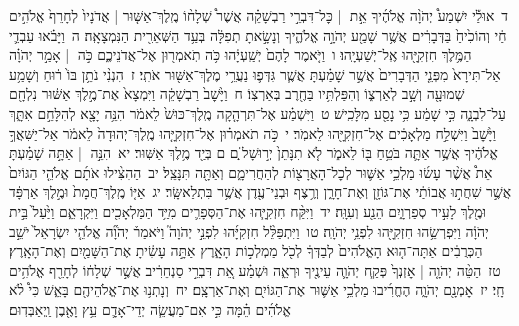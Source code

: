 \documentclass[18pt]{article}
\newcommand{\vart}[1]{\Bfootnote{#1}}	%
\begin{document}
 {\loc ד~}אוּלַ֡י יִשְׁמַע֩ יְהֹוָ֨ה אֱלֹהֶ֜יךָ אֵ֣ת  |  כׇּל־דִּבְרֵ֣י רַבְשָׁקֵ֗ה אֲשֶׁר֩ שְׁלָח֨וֹ מֶֽלֶךְ־אַשּׁ֤וּר  |  אֲדֹנָיו֙ לְחָרֵף֙ אֱלֹהִ֣ים חַ֔י וְהוֹכִ֙יחַ֙ בַּדְּבָרִ֔ים אֲשֶׁ֥ר שָׁמַ֖ע יְהֹוָ֣ה אֱלֹהֶ֑יךָ וְנָשָׂ֣אתָ תְפִלָּ֔ה בְּעַ֥ד הַשְּׁאֵרִ֖ית הַנִּמְצָאָֽה׃ \startlock
 {\loc ה~}וַיָּבֹ֗אוּ עַבְדֵ֛י הַמֶּ֥לֶךְ חִזְקִיָּ֖הוּ אֶֽל־יְשַׁעְיָֽהוּ׃ \startlock
 {\loc ו~}וַיֹּ֤אמֶר לָהֶם֙ יְשַֽׁעְיָ֔הוּ כֹּ֥ה תֹֽאמְר֖וּן אֶל־אֲדֹנֵיכֶ֑ם כֹּ֣ה  |  אָמַ֣ר יְהֹוָ֗ה אַל־תִּירָא֙ מִפְּנֵ֤י הַדְּבָרִים֙ אֲשֶׁ֣ר שָׁמַ֗עְתָּ אֲשֶׁ֧ר גִּדְּפ֛וּ נַעֲרֵ֥י מֶלֶךְ־אַשּׁ֖וּר אֹתִֽי׃ \startlock
 {\loc ז~}הִנְנִ֨י נֹתֵ֥ן בּוֹ֙ ר֔וּחַ וְשָׁמַ֥ע שְׁמוּעָ֖ה וְשָׁ֣ב לְאַרְצ֑וֹ וְהִפַּלְתִּ֥יו בַּחֶ֖רֶב בְּאַרְצֽוֹ׃ \startlock
 {\loc ח~}וַיָּ֙שׇׁב֙ רַבְשָׁקֵ֔ה וַיִּמְצָא֙ אֶת־מֶ֣לֶךְ אַשּׁ֔וּר נִלְחָ֖ם עַל־לִבְנָ֑ה כִּ֣י שָׁמַ֔ע כִּ֥י נָסַ֖ע מִלָּכִֽישׁ׃ \startlock
 {\loc ט~}וַיִּשְׁמַ֗ע אֶל־תִּרְהָ֤קָה מֶֽלֶךְ־כּוּשׁ֙ לֵאמֹ֔ר הִנֵּ֥ה יָצָ֖א לְהִלָּחֵ֣ם אִתָּ֑ךְ וַיָּ֙שׇׁב֙ וַיִּשְׁלַ֣ח מַלְאָכִ֔ים אֶל־חִזְקִיָּ֖הוּ לֵאמֹֽר׃ \startlock
 {\loc י~}כֹּ֣ה תֹאמְר֗וּן אֶל־חִזְקִיָּ֤הוּ מֶֽלֶךְ־יְהוּדָה֙ לֵאמֹ֔ר אַל־יַשִּׁאֲךָ֣ אֱלֹהֶ֔יךָ אֲשֶׁ֥ר אַתָּ֛ה בֹּטֵ֥חַ בּ֖וֹ לֵאמֹ֑ר לֹ֤א תִנָּתֵן֙ יְר֣וּשָׁל ַ֔͏ְם ם בְּיַ֖ד מֶ֥לֶךְ אַשּֽׁוּר׃ \startlock
 {\loc יא~}הִנֵּ֣ה  |  אַתָּ֣ה שָׁמַ֗עְתָּ אֵת֩ אֲשֶׁ֨ר עָשׂ֜וּ מַלְכֵ֥י אַשּׁ֛וּר לְכׇל־הָאֲרָצ֖וֹת לְהַחֲרִימָ֑ם וְאַתָּ֖ה תִּנָּצֵֽל׃ \startlock
 {\loc יב~}הַהִצִּ֨ילוּ אֹתָ֜ם אֱלֹהֵ֤י הַגּוֹיִם֙ אֲשֶׁ֣ר שִׁחֲת֣וּ אֲבוֹתַ֔י אֶת־גּוֹזָ֖ן וְאֶת־חָרָ֑ן וְרֶ֥צֶף וּבְנֵי־עֶ֖דֶן אֲשֶׁ֥ר בִּתְלַאשָּֽׂר׃ \startlock
 {\loc יג~}אַיּ֤וֹ מֶֽלֶךְ־חֲמָת֙ וּמֶ֣לֶךְ אַרְפָּ֔ד וּמֶ֖לֶךְ לָעִ֣יר סְפַרְוָ֑יִם הֵנַ֖ע וְעִוָּֽה׃ \startlock
 {\loc יד~}וַיִּקַּ֨ח חִזְקִיָּ֧הוּ אֶת־הַסְּפָרִ֛ים מִיַּ֥ד הַמַּלְאָכִ֖ים וַיִּקְרָאֵ֑ם וַיַּ֙עַל֙ בֵּ֣ית יְהֹוָ֔ה וַיִּפְרְשֵׂ֥הוּ חִזְקִיָּ֖הוּ לִפְנֵ֥י יְהֹוָֽה׃ \startlock
 {\loc טו~}וַיִּתְפַּלֵּ֨ל חִזְקִיָּ֜הוּ לִפְנֵ֣י יְהֹוָה֮ וַיֹּאמַר֒ יְהֹוָ֞ה אֱלֹהֵ֤י יִשְׂרָאֵל֙ יֹשֵׁ֣ב הַכְּרֻבִ֔ים אַתָּה־ה֤וּא הָאֱלֹהִים֙ לְבַדְּךָ֔ לְכֹ֖ל מַמְלְכ֣וֹת הָאָ֑רֶץ אַתָּ֣ה עָשִׂ֔יתָ אֶת־הַשָּׁמַ֖יִם וְאֶת־הָאָֽרֶץ׃ \startlock
 {\loc טז~}הַטֵּ֨ה יְהֹוָ֤ה  |  אׇזְנְךָ֙  \edtext{וּֽשְׁמָ֔ע}{\vart{וּֽשֲׁמָ֔ע | }}  פְּקַ֧ח יְהֹוָ֛ה עֵינֶ֖יךָ וּרְאֵ֑ה וּשְׁמַ֗ע אֵ֚ת דִּבְרֵ֣י סַנְחֵרִ֔יב אֲשֶׁ֣ר שְׁלָח֔וֹ לְחָרֵ֖ף אֱלֹהִ֥ים חָֽי׃ \startlock
 {\loc יז~}אׇמְנָ֖ם יְהֹוָ֑ה הֶחֱרִ֜יבוּ מַלְכֵ֥י אַשּׁ֛וּר אֶת־הַגּוֹיִ֖ם וְאֶת־אַרְצָֽם׃ \startlock
 {\loc יח~}וְנָתְנ֥וּ אֶת־אֱלֹהֵיהֶ֖ם בָּאֵ֑שׁ כִּי֩ לֹ֨א אֱלֹהִ֜ים הֵ֗מָּה כִּ֣י אִם־מַעֲשֵׂ֧ה יְדֵי־אָדָ֛ם עֵ֥ץ וָאֶ֖בֶן וַֽיְאַבְּדֽוּם׃ \startlock
\end{document}
